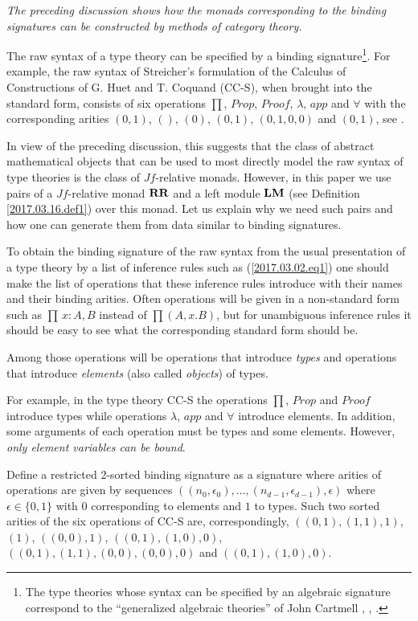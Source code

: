 \documentclass[12pt]{amsart}
\newcommand{\RR}{{\bf RR}}
\newcommand{\LM}{{\bf LM}}
\begin{document}
{\em The preceding discussion shows how the monads corresponding to the binding signatures can be constructed by methods of category theory.}

The raw syntax of a type theory can be specified by a binding signature\footnote{The type theories whose syntax can be specified by an algebraic signature correspond to the ``generalized algebraic theories'' of John Cartmell \cite{Cartmell1}, \cite{Cartmell0}, \cite{Garner}.}.  For example, the raw syntax of Streicher's formulation of the Calculus of Constructions of G. Huet and T. Coquand (CC-S), when brought into the standard form, consists of six operations $\prod$, $Prop$, $Proof$, $\lambda$, $app$ and $\forall$ with the corresponding arities $(0,1)$, $()$, $(0)$, $(0,1)$, $(0,1,0,0)$ and $(0,1)$, see \cite[p.157]{Streicher}.  

In view of the preceding discussion, this suggests that the class of abstract mathematical objects that can be used to most directly model the raw syntax of type theories is the class of $Jf$-relative monads. However, in this paper we use pairs of a $Jf$-relative monad $\RR$ and a left module $\LM$ (see Definition \ref{2017.03.16.def1}) over this monad. Let us explain why we need such pairs and how one can generate them from data similar to binding signatures. 

To obtain the binding signature of the raw syntax from the usual presentation of a type theory by a list of inference rules such as (\ref{2017.03.02.eq1}) one should make the list of operations that these inference rules introduce with their names and their binding arities. Often operations will be given in a non-standard form such as $\prod\,x:A,B$ instead of $\prod(A,x.B)$, but for unambiguous inference rules it should be easy to see what the corresponding standard form should be. 

Among those operations will be operations that introduce {\em types} and operations that introduce {\em elements} (also called {\em objects}) of types. 

For example, in the type theory CC-S the operations $\prod$, $Prop$ and $Proof$ introduce types while operations $\lambda$, $app$ and $\forall$ introduce elements. 
In addition, some arguments of each operation must be types and some elements. However, {\em only element variables can be bound}. 

Define a restricted 2-sorted binding signature as a signature where arities of operations are given by sequences $((n_0,\epsilon_0),\dots,(n_{d-1},\epsilon_{d-1}),\epsilon)$ where $\epsilon\in\{0,1\}$ with $0$ corresponding to elements and $1$ to types. Such two sorted arities of the six operations of CC-S are, correspondingly, $((0,1),(1,1),1)$, $(1)$, $((0,0),1)$, $((0,1),(1,0),0)$, $((0,1),(1,1),(0,0),(0,0),0)$ and $((0,1),(1,0),0)$. 
\end{document}
